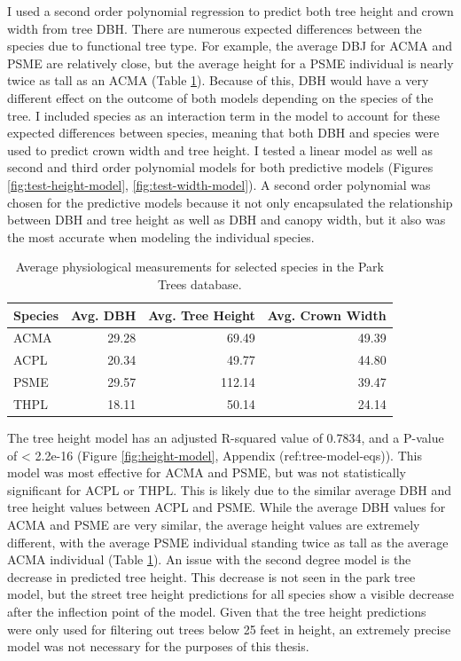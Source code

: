 \documentclass[12pt,twoside]{reedthesis}
\begin{document}
I used a second order polynomial regression to predict both tree height and crown width from tree DBH. There are numerous expected differences between the species due to functional tree type. For example, the average DBJ for ACMA and PSME are relatively close, but the average height for a PSME individual is nearly twice as tall as an ACMA (Table \ref{tab:tree-stats-table}). Because of this, DBH would have a very different effect on the outcome of both models depending on the species of the tree. I included species as an interaction term in the model to account for these expected differences between species, meaning that both DBH and species were used to predict crown width and tree height. I tested a linear model as well as second and third order polynomial models for both predictive models (Figures \ref{fig:test-height-model}, \ref{fig:test-width-model}). A second order polynomial was chosen for the predictive models because it not only encapsulated the relationship between DBH and tree height as well as DBH and canopy width, but it also was the most accurate when modeling the individual species.
\begin{table}

\caption[Physiological Tree Measurements]{\label{tab:tree-stats-table}Average physiological measurements for selected species in the Park Trees database.}
\centering
\begin{tabular}[t]{lrrr}
\toprule
Species & Avg. DBH & Avg. Tree Height & Avg. Crown Width\\
\midrule
ACMA & 29.28 & 69.49 & 49.39\\
ACPL & 20.34 & 49.77 & 44.80\\
PSME & 29.57 & 112.14 & 39.47\\
THPL & 18.11 & 50.14 & 24.14\\
\bottomrule
\end{tabular}
\end{table}
The tree height model has an adjusted R-squared value of 0.7834, and a P-value of \textless{} 2.2e-16 (Figure \ref{fig:height-model}, Appendix (ref:tree-model-eqs)). This model was most effective for ACMA and PSME, but was not statistically significant for ACPL or THPL. This is likely due to the similar average DBH and tree height values between ACPL and PSME. While the average DBH values for ACMA and PSME are very similar, the average height values are extremely different, with the average PSME individual standing twice as tall as the average ACMA individual (Table \ref{tab:tree-stats-table}). An issue with the second degree model is the decrease in predicted tree height. This decrease is not seen in the park tree model, but the street tree height predictions for all species show a visible decrease after the inflection point of the model. Given that the tree height predictions were only used for filtering out trees below 25 feet in height, an extremely precise model was not necessary for the purposes of this thesis.
\end{document}
